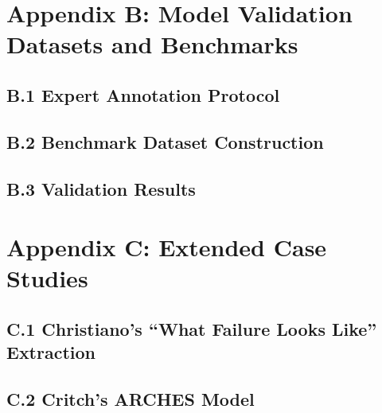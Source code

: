 \documentclass[
  11pt,
  letterpaper,
]{book}
\begin{document}
\section*{Appendix B: Model Validation Datasets and
Benchmarks}\label{sec-appendix-validation}


\subsection*{B.1 Expert Annotation
Protocol}\label{sec-annotation-protocol}

\subsection*{B.2 Benchmark Dataset
Construction}\label{sec-benchmark-construction}

\subsection*{B.3 Validation Results}\label{sec-validation-results}

\section*{Appendix C: Extended Case
Studies}\label{sec-appendix-case-studies}


\subsection*{C.1 Christiano's ``What Failure Looks Like''
Extraction}\label{sec-christiano-extraction}

\subsection*{C.2 Critch's ARCHES Model}\label{sec-critch-extraction}
\end{document}
